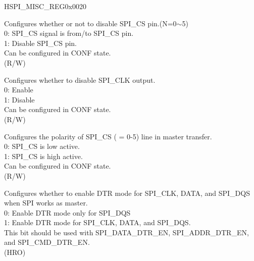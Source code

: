 \begin{register}{H}{SPI\_MISC\_REG}{0x0020}\label{regdesc:SPIMISCREG}
%
%
%
%
%
%
%
%
%
%
%
%
%
%
%
%
%
%
%
%
\regnewline%
\begin{regdesc}\begin{reglist}
\label{fielddesc:SPICSNDIS}\item [SPI\_CS\regindex{n}\_DIS] Configures whether or not to disable SPI\_CS pin.(N=0$\sim$5)\\
0: SPI\_CS signal is from/to SPI\_CS pin.\\
1: Disable SPI\_CS pin.\\
Can be configured in CONF state. \\ (R/W)
\label{fielddesc:SPICKDIS}\item [SPI\_CK\_DIS] Configures whether to disable SPI\_CLK output.\\
0: Enable\\
1: Disable\\
Can be configured in CONF state. \\ (R/W)
\label{fielddesc:SPIMASTERCSPOL}\item [SPI\_MASTER\_CS\_POL] Configures the polarity of SPI\_CS ( = 0-5) line in master transfer.\\
0: SPI\_CS is low active.\\
1: SPI\_CS is high active.\\
Can be configured in CONF state.\\ (R/W)
\label{fielddesc:SPICLKDATADTREN}\item [SPI\_CLK\_DATA\_DTR\_EN] Configures whether to enable DTR mode for SPI\_CLK, DATA, and SPI\_DQS when SPI works as master.\\
0: Enable DTR mode only for SPI\_DQS\\
1: Enable DTR mode for SPI\_CLK, DATA, and SPI\_DQS.\\
This bit should be used with SPI\_DATA\_DTR\_EN, SPI\_ADDR\_DTR\_EN, and SPI\_CMD\_DTR\_EN. \\
(HRO)


\end{reglist}
\end{regdesc}
\end{register}

